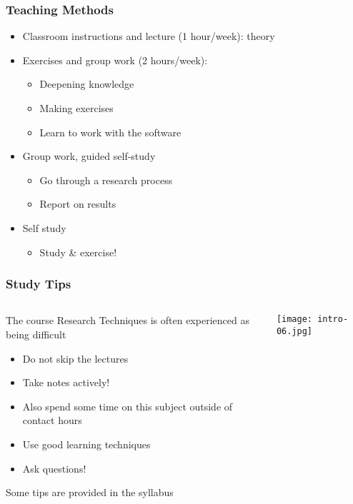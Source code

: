 \documentclass[aspectratio=169]{beamer}
\begin{document}
\begin{frame}
  \frametitle{Teaching Methods}
  
  \begin{itemize}
    \item Classroom instructions and lecture (1 hour/week): theory
    \item Exercises and group work (2 hours/week):
    \begin{itemize}
      \item Deepening knowledge
      \item Making exercises
      \item Learn to work with the software
    \end{itemize}
    \item Group work, guided self-study
    \begin{itemize}
      \item Go through a research process
      \item Report on results
    \end{itemize}
    \item Self study
    \begin{itemize}
      \item Study \& exercise!
    \end{itemize}
  \end{itemize}
\end{frame}

\begin{frame}
  \frametitle{Study Tips}
  
  \begin{columns}
    \begin{column}{.8\textwidth}
        The course Research Techniques is often experienced as being difficult
      
      \begin{itemize}
        \item Do not skip the lectures
        \item Take notes actively!
        \item Also spend some time on this subject outside of contact hours
        \item Use good learning techniques
        \item Ask questions!
      \end{itemize}
      
      Some tips are provided in the syllabus
      
    \end{column}
  
    \begin{column}{.2\textwidth}
      \texttt{[image: intro-06.jpg]}
    \end{column}
  \end{columns}
  
\end{frame}
\end{document}
